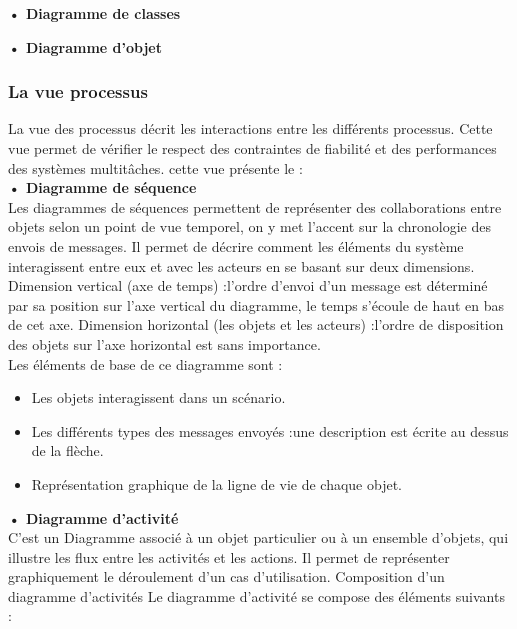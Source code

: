 \documentclass[11pt,a4paper,oneside]{book}
\begin{document}
			\textbf{• Diagramme de classes}
			
			\textbf{• Diagramme d’objet}
			\subsubsection{La vue processus}
			La vue des processus décrit les interactions entre les différents processus. Cette vue permet de vérifier le respect des contraintes de fiabilité et des performances des systèmes multitâches. cette vue présente le :
			\\
			
			\textbf{• Diagramme de séquence}
			\\
			
			Les diagrammes de séquences permettent de représenter des collaborations entre objets selon un point de vue temporel, on y met l’accent sur la chronologie des envois de messages. Il permet de décrire comment les éléments du système interagissent entre eux et avec les acteurs en se basant sur deux dimensions.\\
			
			Dimension vertical (axe de temps) :l’ordre d’envoi d’un message est déterminé par sa position sur l'axe vertical du diagramme, le temps s’écoule de haut en bas de cet axe.
			Dimension horizontal (les objets et les acteurs) :l’ordre de disposition des objets sur l’axe horizontal est sans importance.\\
			
			Les éléments de base de ce diagramme sont :\\
			\begin{itemize}
				\item Les objets interagissent dans un scénario.
				\item Les différents types des messages envoyés :une description est écrite au dessus de la flèche.
				\item Représentation graphique de la ligne de vie de chaque objet.\\
			\end{itemize}
			
			
			\textbf{• Diagramme d’activité}\\
			
			C’est un Diagramme associé à un objet particulier ou à un ensemble d’objets, qui illustre les flux entre les activités et les actions. Il permet de représenter graphiquement le déroulement d’un cas d’utilisation. Composition d’un diagramme d’activités
			Le diagramme d’activité se compose des éléments suivants :
			\\
			
\end{document}
